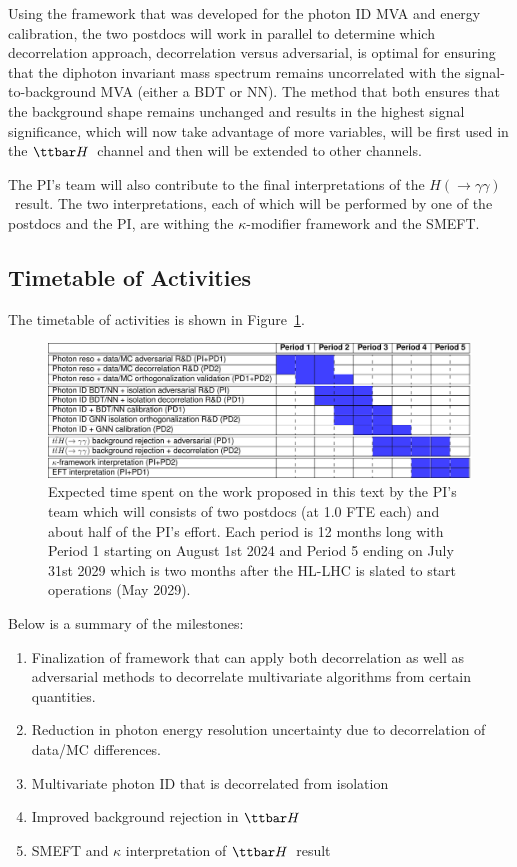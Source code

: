 \documentclass[letter, USenglish, 11pt, subfigure]{article}
\newcommand{\ttH}{\ensuremath{\ttbar H}}
\newcommand{\hyy}{\ensuremath{H(\to\gamma\gamma)}}
\begin{document}
Using the framework that was developed for the photon ID MVA and energy calibration, the two postdocs will work in parallel to determine which decorrelation approach, decorrelation versus adversarial, is optimal for ensuring that the diphoton invariant mass spectrum remains uncorrelated with the signal-to-background MVA (either a BDT or NN). The method that both ensures that the background shape remains unchanged and results in the highest signal significance, which will now take advantage of more variables, will be first used in the \ttH\ channel and then will be extended to other channels.

The PI's team will also contribute to the final interpretations of the \hyy\ result. The two interpretations, each of which will be performed by one of the postdocs and the PI, are withing the $\kappa$-modifier framework and the SMEFT. 


\subsection{Timetable of Activities}
\label{sec:timetable}

The timetable of activities is shown in Figure~\ref{fig:timetable}.
\begin{figure}[!htbp]
  \centering
  \includegraphics[width=\textwidth]{figures/timeline.pdf}
  \caption{Expected time spent on the work proposed in this text by the PI's team which will consists of two postdocs (at 1.0 FTE each) and about half of the PI's effort. Each period is 12 months long with Period 1 starting on August 1st 2024 and Period 5 ending on July 31st 2029 which is two months after the HL-LHC is slated to start operations (May 2029). 
  }
  \label{fig:timetable}
\end{figure}

Below is a summary of the milestones:
\begin{enumerate}
\item Finalization of framework that can apply both decorrelation as well as adversarial methods to decorrelate multivariate algorithms from certain quantities. 
\item Reduction in photon energy resolution uncertainty due to decorrelation of data/MC differences.
\item Multivariate photon ID that is decorrelated from isolation
\item Improved background rejection in \ttH\
\item SMEFT and $\kappa$ interpretation of \ttH\ result
\end{enumerate}
\end{document}
